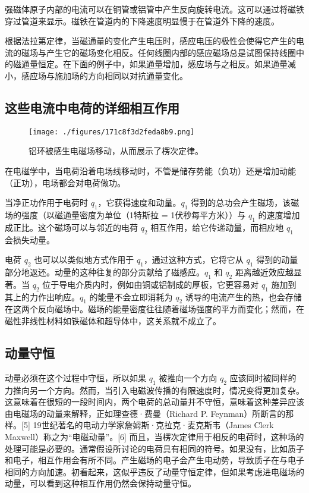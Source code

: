 强磁体原子内部的电流可以在铜管或铝管中产生反向旋转电流。这可以通过将磁铁穿过管道来显示。磁铁在管道内的下降速度明显慢于在管道外下降的速度。

根据法拉第定律，当磁通量的变化产生电压时，感应电压的极性会使得它产生的电流的磁场与产生它的磁场变化相反。任何线圈内部的感应磁场总是试图保持线圈中的磁通量恒定。在下面的例子中，如果通量增加，感应场与之相反。如果通量减小，感应场与施加场的方向相同以对抗通量变化。

\subsection{这些电流中电荷的详细相互作用}

\begin{figure}[ht]
\centering
\texttt{[image: ./figures/171c8f3d2feda8b9.png]}
\caption{铝环被感生电磁场移动，从而展示了楞次定律。} \label{fig_LCDL_3}
\end{figure}

在电磁学中，当电荷沿着电场线移动时，不管是储存势能（负功）还是增加动能（正功），电场都会对电荷做功。

当净正功作用于电荷时 $ q_1 $，它获得速度和动量。$ q_1 $ 得到的总功会产生磁场，该磁场的强度（以磁通量密度为单位（1特斯拉 = 1伏秒每平方米））与 $ q_1 $ 的速度增加成正比。这个磁场可以与邻近的电荷 $ q_2 $ 相互作用，给它传递动量，而相应地 $ q_1 $ 会损失动量。


电荷 $ q_2 $  也可以以类似地方式作用于 $ q_1 $，通过这种方式，它将它从 $ q_1 $ 得到的动量部分地返还。动量的这种往复的部分贡献给了磁感应。$ q_1 $ 和 $ q_2 $  距离越近效应越显著。当 $ q_2 $  位于导电介质内时，例如由铜或铝制成的厚板，它更容易对 $q_1$ 施加到其上的力作出响应。$ q_1 $ 的能量不会立即消耗为 $ q_2 $  诱导的电流产生的热，也会存储在这两个反向磁场中。磁场的能量密度往往随着磁场强度的平方而变化；然而，在磁性非线性材料如铁磁体和超导体中，这关系就不成立了。

\subsection{动量守恒}

动量必须在这个过程中守恒，所以如果 $ q_1 $ 被推向一个方向  $ q_2 $  应该同时被同样的力推向另一个方向。然而，当引入电磁波传播的有限速度时，情况变得更加复杂。这意味着在很短的一段时间内，两个电荷的总动量并不守恒，意味着这种差异应该由电磁场的动量来解释，正如理查德·费曼（Richard P. Feynman）所断言的那样。[5] 19世纪著名的电动力学家詹姆斯·克拉克·麦克斯韦（James Clerk Maxwell）称之为“电磁动量”。[6] 而且，当楞次定律用于相反的电荷时，这种场的处理可能是必要的。通常假设所讨论的电荷具有相同的符号。如果没有，比如质子和电子，相互作用会有所不同。产生磁场的电子会产生电动势，导致质子在与电子相同的方向加速。初看起来，这似乎违反了动量守恒定律，但如果考虑进电磁场的动量，可以看到这种相互作用仍然会保持动量守恒。

